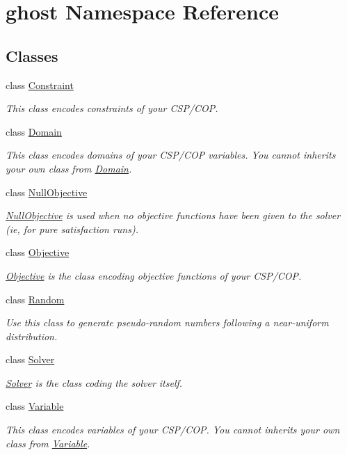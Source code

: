 \hypertarget{namespaceghost}{}\section{ghost Namespace Reference}
\label{namespaceghost}
\subsection*{Classes}
\begin{DoxyCompactItemize}
\item 
class \hyperlink{classghost_1_1Constraint}{Constraint}
\begin{DoxyCompactList}\small\item\em This class encodes constraints of your C\+S\+P/\+C\+OP. \end{DoxyCompactList}\item 
class \hyperlink{classghost_1_1Domain}{Domain}
\begin{DoxyCompactList}\small\item\em This class encodes domains of your C\+S\+P/\+C\+OP variables. You cannot inherits your own class from \hyperlink{classghost_1_1Domain}{Domain}. \end{DoxyCompactList}\item 
class \hyperlink{classghost_1_1NullObjective}{Null\+Objective}
\begin{DoxyCompactList}\small\item\em \hyperlink{classghost_1_1NullObjective}{Null\+Objective} is used when no objective functions have been given to the solver (ie, for pure satisfaction runs). \end{DoxyCompactList}\item 
class \hyperlink{classghost_1_1Objective}{Objective}
\begin{DoxyCompactList}\small\item\em \hyperlink{classghost_1_1Objective}{Objective} is the class encoding objective functions of your C\+S\+P/\+C\+OP. \end{DoxyCompactList}\item 
class \hyperlink{classghost_1_1Random}{Random}
\begin{DoxyCompactList}\small\item\em Use this class to generate pseudo-\/random numbers following a near-\/uniform distribution. \end{DoxyCompactList}\item 
class \hyperlink{classghost_1_1Solver}{Solver}
\begin{DoxyCompactList}\small\item\em \hyperlink{classghost_1_1Solver}{Solver} is the class coding the solver itself. \end{DoxyCompactList}\item 
class \hyperlink{classghost_1_1Variable}{Variable}
\begin{DoxyCompactList}\small\item\em This class encodes variables of your C\+S\+P/\+C\+OP. You cannot inherits your own class from \hyperlink{classghost_1_1Variable}{Variable}. \end{DoxyCompactList}\end{DoxyCompactItemize}

